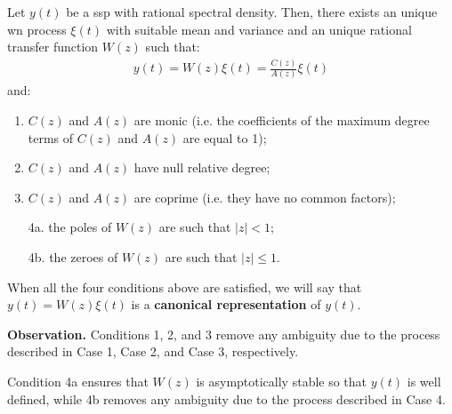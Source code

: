 
\begin{theorem}
	Let $y(t)$ be a \gls{ssp} with rational spectral density. 
	Then, there exists an unique \gls{wn} process $\xi(t)$ with suitable mean and variance and an unique rational transfer function $W(z)$ such that:
	\begin{align*}
		y(t) = W(z)\xi(t)=\frac{C(z)}{A(z)}\xi(t)
	\end{align*}
    and:
    \begin{enumerate}
		\item $C(z)$ and $A(z)$ are monic (i.e. the coefficients of the maximum degree terms of $C(z)$ and $A(z)$ are equal to 1);
		\item $C(z)$ and $A(z)$ have null relative degree;
		\item $C(z)$ and $A(z)$ are coprime (i.e. they have no common factors);
		\item[4a.]the poles of $W(z)$ are such that $|z|< 1$;
		\item[4b.]the zeroes of $W(z)$ are such that $|z|\leq 1$.
    \end{enumerate}
\end{theorem}

When all the four conditions above are satisfied, we will say that $y(t) = W(z)\xi(t)$ is a \textbf{canonical representation} of $y(t)$.

\textbf{Observation.} Conditions 1, 2, and 3 remove any ambiguity due to the process described in Case 1, Case 2, and Case 3, respectively. 

Condition 4a ensures that $W(z)$ is asymptotically stable so that $y(t)$ is well defined, while 4b removes any ambiguity due to the process described in Case 4.

